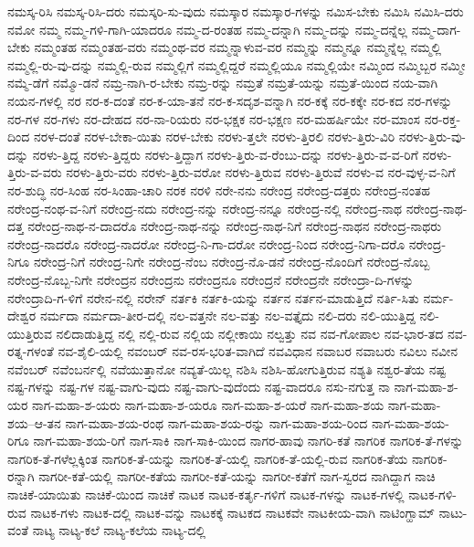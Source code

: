{ನಮಸ್ಕ-ರಿಸಿ
ನಮಸ್ಕ-ರಿಸಿ-ದರು
ನಮಸ್ಕರಿ-ಸು-ವುದು
ನಮಸ್ಕಾರ
ನಮಸ್ಕಾರ-ಗಳನ್ನು
ನಮಿಸ-ಬೇಕು
ನಮಿಸಿ
ನಮಿಸಿ-ದರು
ನಮೋ
ನಮ್ಮ
ನಮ್ಮ-ಗಳಿ-ಗಾಗಿ-ಯಾದರೂ
ನಮ್ಮ-ದ-ರಂತಹ
ನಮ್ಮ-ದನ್ನಾಗಿ
ನಮ್ಮ-ದನ್ನು
ನಮ್ಮ-ದನ್ನೆಲ್ಲ
ನಮ್ಮ-ದಾಗ-ಬೇಕು
ನಮ್ಮಂತಹ
ನಮ್ಮಂತಹ-ವರು
ನಮ್ಮಂಥ-ವರ
ನಮ್ಮನ್ನಾಳುವ-ವರ
ನಮ್ಮನ್ನು
ನಮ್ಮನ್ನೂ
ನಮ್ಮನ್ನೆಲ್ಲ
ನಮ್ಮಲ್ಲಿ
ನಮ್ಮಲ್ಲಿ-ರು-ವು-ದನ್ನು
ನಮ್ಮಲ್ಲಿ-ರುವ
ನಮ್ಮಲ್ಲಿಗೆ
ನಮ್ಮಲ್ಲಿದ್ದರೆ
ನಮ್ಮಲ್ಲಿಯೂ
ನಮ್ಮಲ್ಲಿಯೇ
ನಮ್ಮಿಂದ
ನಮ್ಮಿಬ್ಬರ
ನಮ್ಮೀ
ನಮ್ಮೆ-ಡೆಗೆ
ನಮ್ಮೊ-ಡನೆ
ನಮ್ರ-ನಾಗಿ-ರ-ಬೇಕು
ನಮ್ರ-ರನ್ನು
ನಮ್ರತೆ
ನಮ್ರತೆ-ಯನ್ನು
ನಮ್ರತೆ-ಯಿಂದ
ನಯ-ವಾಗಿ
ನಯನ-ಗಳಲ್ಲಿ
ನರ
ನರ-ಕ-ದಂತೆ
ನರ-ಕ-ಯಾ-ತನೆ
ನರ-ಕ-ಸದೃಶ-ವನ್ನಾಗಿ
ನರ-ಕಕ್ಕೆ
ನರ-ಕಕ್ಕೇ
ನರ-ಕದ
ನರ-ಗಳನ್ನು
ನರ-ಗಳ
ನರ-ಗಳು
ನರ-ದೇಹದ
ನರ-ನಾ-ರಿಯರು
ನರ-ಭಕ್ಷಕ
ನರ-ಭಕ್ಷಣ
ನರ-ಮಹರ್ಷಿಯೇ
ನರ-ಮಾಂಸ
ನರ-ರಕ್ತ-ದಿಂದ
ನರಳ-ದಂತೆ
ನರಳ-ಬೇಕಾ-ಯಿತು
ನರಳ-ಬೇಕು
ನರಳು-ತ್ತಲೇ
ನರಳು-ತ್ತಿರಲಿ
ನರಳು-ತ್ತಿರು-ವಿರಿ
ನರಳು-ತ್ತಿರು-ವು-ದನ್ನು
ನರಳು-ತ್ತಿದ್ದ
ನರಳು-ತ್ತಿದ್ದರು
ನರಳು-ತ್ತಿದ್ದಾಗ
ನರಳು-ತ್ತಿರು-ವ-ರೆಂಬು-ದನ್ನು
ನರಳು-ತ್ತಿರು-ವ-ವ-ರಿಗೆ
ನರಳು-ತ್ತಿರು-ವ-ವರು
ನರಳು-ತ್ತಿರು-ವರು
ನರಳು-ತ್ತಿರು-ವರೋ
ನರಳು-ತ್ತಿರುವ
ನರಳು-ತ್ತಿರುವೆ
ನರಳು-ವ
ನರ-ವುಳ್ಳ-ವ-ನಿಗೆ
ನರ-ಶುದ್ಧಿ
ನರ-ಸಿಂಹ
ನರ-ಸಿಂಹಾ-ಚಾರಿ
ನರಕ
ನರಳಿ
ನರೇ-ನನು
ನರೇಂದ್ರ
ನರೇಂದ್ರ-ದತ್ತರು
ನರೇಂದ್ರ-ನಂತಹ
ನರೇಂದ್ರ-ನಂಥ-ವ-ನಿಗೆ
ನರೇಂದ್ರ-ನದು
ನರೇಂದ್ರ-ನನ್ನು
ನರೇಂದ್ರ-ನನ್ನೂ
ನರೇಂದ್ರ-ನಲ್ಲಿ
ನರೇಂದ್ರ-ನಾಥ
ನರೇಂದ್ರ-ನಾಥ-ದತ್ತ
ನರೇಂದ್ರ-ನಾಥ-ನ-ದಾದರೊ
ನರೇಂದ್ರ-ನಾಥ-ನನ್ನು
ನರೇಂದ್ರ-ನಾಥ-ನಿಗೆ
ನರೇಂದ್ರ-ನಾಥನ
ನರೇಂದ್ರ-ನಾಥರು
ನರೇಂದ್ರ-ನಾದರೊ
ನರೇಂದ್ರ-ನಾದರೋ
ನರೇಂದ್ರ-ನಿ-ಗಾ-ದರೋ
ನರೇಂದ್ರ-ನಿಂದ
ನರೇಂದ್ರ-ನಿಗಾ-ದರೊ
ನರೇಂದ್ರ-ನಿಗೂ
ನರೇಂದ್ರ-ನಿಗೆ
ನರೇಂದ್ರ-ನಿಗೇ
ನರೇಂದ್ರ-ನೆಂಬ
ನರೇಂದ್ರ-ನೊ-ಡನೆ
ನರೇಂದ್ರ-ನೊಂದಿಗೆ
ನರೇಂದ್ರ-ನೊಬ್ಬ
ನರೇಂದ್ರ-ನೊಬ್ಬ-ನಿಗೇ
ನರೇಂದ್ರನ
ನರೇಂದ್ರನು
ನರೇಂದ್ರನೂ
ನರೇಂದ್ರನೆ
ನರೇಂದ್ರನೇ
ನರೇಂದ್ರಾ-ದಿ-ಗಳನ್ನು
ನರೇಂದ್ರಾದಿ-ಗ-ಳಿಗೆ
ನರೇನ-ನಲ್ಲಿ
ನರೇನ್
ನರ್ತಕಿ
ನರ್ತಕಿ-ಯನ್ನು
ನರ್ತನ
ನರ್ತನ-ಮಾಡುತ್ತಿದೆ
ನರ್ತಿ-ಸಿತು
ನರ್ಮ-ದೇಶ್ವರ
ನರ್ಮದಾ
ನರ್ಮದಾ-ತೀರ-ದಲ್ಲಿ
ನಲ-ವತ್ತನೇ
ನಲ-ವತ್ತು
ನಲ-ವತ್ತೈದು
ನಲಿ-ದರು
ನಲಿ-ಯುತ್ತಿದ್ದ
ನಲಿ-ಯುತ್ತಿರುವ
ನಲಿದಾಡುತ್ತಿದ್ದ
ನಲ್ಲಿ
ನಲ್ಲಿ-ರುವ
ನಲ್ಲಿಯ
ನಲ್ಲೀಕಾಯಿ
ನಲ್ವತ್ತು
ನವ
ನವ-ಗೋಪಾಲ
ನವ-ಭಾರ-ತದ
ನವ-ರತ್ನ-ಗಳಂತೆ
ನವ-ಶೈಲಿ-ಯಲ್ಲಿ
ನವಂಬರ್
ನವ-ರಸ-ಭರಿತ-ವಾಗಿದೆ
ನವವಿಧಾನ
ನವಾಬರ
ನವಾಬರು
ನವಿಲು
ನವೀನ
ನವೆಂಬರ್
ನವೆಂಬರ್ನಲ್ಲಿ
ನವೆಯುತ್ತಾನೋ
ನವ್ಯತೆ-ಯಿಲ್ಲ
ನಶಿಸಿ
ನಶಿಸಿ-ಹೋಗುತ್ತಿರುವ
ನಶ್ಯತಿ
ನಶ್ವರ-ತೆಯ
ನಷ್ಟ
ನಷ್ಟ-ಗಳನ್ನು
ನಷ್ಟ-ಗಳ
ನಷ್ಟ-ವಾಗು-ವುದು
ನಷ್ಟ-ವಾಗು-ವುದೆಂದು
ನಷ್ಟ-ವಾದರೂ
ನಸು-ನಗುತ್ತ
ನಾ
ನಾಗ-ಮಹಾ-ಶ-ಯರ
ನಾಗ-ಮಹಾ-ಶ-ಯರು
ನಾಗ-ಮಹಾ-ಶ-ಯರೂ
ನಾಗ-ಮಹಾ-ಶ-ಯರೆ
ನಾಗ-ಮಹಾ-ಶಯ
ನಾಗ-ಮಹಾ-ಶಯ--ಆ-ತನ
ನಾಗ-ಮಹಾ-ಶಯ-ರಂಥ
ನಾಗ-ಮಹಾ-ಶಯ-ರನ್ನು
ನಾಗ-ಮಹಾ-ಶಯ-ರಿಂದ
ನಾಗ-ಮಹಾ-ಶಯ-ರಿಗೂ
ನಾಗ-ಮಹಾ-ಶಯ-ರಿಗೆ
ನಾಗ-ಸಾಕಿ
ನಾಗ-ಸಾಕಿ-ಯಿಂದ
ನಾಗರ-ಹಾವು
ನಾಗರಿ-ಕತೆ
ನಾಗರಿಕ
ನಾಗರಿಕ-ತೆ-ಗಳನ್ನು
ನಾಗರಿಕ-ತೆ-ಗಳೆಲ್ಲಕ್ಕಿಂತ
ನಾಗರಿಕ-ತೆ-ಯನ್ನು
ನಾಗರಿಕ-ತೆ-ಯಲ್ಲಿ
ನಾಗರಿಕ-ತೆ-ಯಲ್ಲಿ-ರುವ
ನಾಗರಿಕ-ತೆಯ
ನಾಗರಿಕ-ರನ್ನಾಗಿ
ನಾಗರೀ-ಕತೆ-ಯಲ್ಲಿ
ನಾಗರೀ-ಕತೆಯ
ನಾಗರೀ-ಕತೆ-ಯನ್ನು
ನಾಗರೀ-ಕತೆಗೆ
ನಾಗ-ಸ್ವರದ
ನಾಗಿದ್ದಾಗ
ನಾಚಿ
ನಾಚಿಕೆ-ಯಾಯಿತು
ನಾಚಿಕೆ-ಯಿಂದ
ನಾಚಿಕೆ
ನಾಟಕ
ನಾಟಕ-ಕರ್ತೃ-ಗಳಿಗೆ
ನಾಟಕ-ಗಳನ್ನು
ನಾಟಕ-ಗಳಲ್ಲಿ
ನಾಟಕ-ಗಳಿ-ರುವ
ನಾಟಕ-ಗಳು
ನಾಟಕ-ದಲ್ಲಿ
ನಾಟಕ-ವನ್ನು
ನಾಟಕಕ್ಕೆ
ನಾಟಕದ
ನಾಟಕವೇ
ನಾಟಕೀಯ-ವಾಗಿ
ನಾಟಿಂಗ್ಹಾಮ್
ನಾಟು-ವಂತೆ
ನಾಟ್ಯ
ನಾಟ್ಯ-ಕಲೆ
ನಾಟ್ಯ-ಕಲೆಯ
ನಾಟ್ಯ-ದಲ್ಲಿ
}
